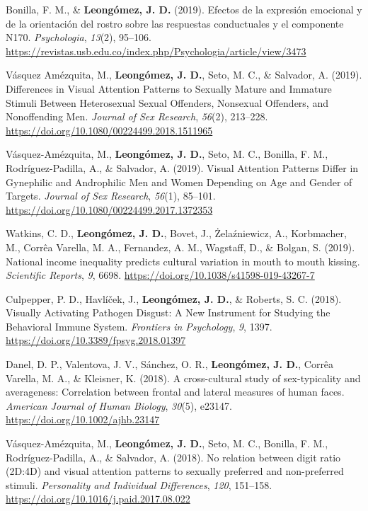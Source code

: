 \documentclass[11pt, a4paper]{awesome-cv}
\begin{document}
\leavevmode\hypertarget{ref-BonillaCarreno2019}{}%
Bonilla, F. M., \& \textbf{Leongómez, J. D.} (2019). {Efectos de la
expresi{ó}n emocional y de la orientaci{ó}n del rostro sobre las
respuestas conductuales y el componente N170}. \emph{Psychologia},
\emph{13}(2), 95--106.
\url{https://revistas.usb.edu.co/index.php/Psychologia/article/view/3473}

\leavevmode\hypertarget{ref-VasquezAmezquita2019}{}%
Vásquez Amézquita, M., \textbf{Leongómez, J. D.}, Seto, M. C., \&
Salvador, A. (2019). {Differences in Visual Attention Patterns to
Sexually Mature and Immature Stimuli Between Heterosexual Sexual
Offenders, Nonsexual Offenders, and Nonoffending Men}. \emph{Journal of
Sex Research}, \emph{56}(2), 213--228.
\url{https://doi.org/10.1080/00224499.2018.1511965}

\leavevmode\hypertarget{ref-Vasquez-Amezquita2017}{}%
Vásquez-Amézquita, M., \textbf{Leongómez, J. D.}, Seto, M. C., Bonilla,
F. M., Rodríguez-Padilla, A., \& Salvador, A. (2019). {Visual Attention
Patterns Differ in Gynephilic and Androphilic Men and Women Depending on
Age and Gender of Targets}. \emph{Journal of Sex Research},
\emph{56}(1), 85--101.
\url{https://doi.org/10.1080/00224499.2017.1372353}

\leavevmode\hypertarget{ref-Watkins2019}{}%
Watkins, C. D., \textbf{Leongómez, J. D.}, Bovet, J., Żelaźniewicz, A.,
Korbmacher, M., Corrêa Varella, M. A., Fernandez, A. M., Wagstaff, D.,
\& Bolgan, S. (2019). {National income inequality predicts cultural
variation in mouth to mouth kissing}. \emph{Scientific Reports},
\emph{9}, 6698. \url{https://doi.org/10.1038/s41598-019-43267-7}

\leavevmode\hypertarget{ref-Culpepper2018}{}%
Culpepper, P. D., Havlíček, J., \textbf{Leongómez, J. D.}, \& Roberts,
S. C. (2018). {Visually Activating Pathogen Disgust: A New Instrument
for Studying the Behavioral Immune System}. \emph{Frontiers in
Psychology}, \emph{9}, 1397.
\url{https://doi.org/10.3389/fpsyg.2018.01397}

\leavevmode\hypertarget{ref-Danel2017}{}%
Danel, D. P., Valentova, J. V., Sánchez, O. R.,
\textbf{Leongómez, J. D.}, Corrêa Varella, M. A., \& Kleisner, K.
(2018). {A cross-cultural study of sex-typicality and averageness:
Correlation between frontal and lateral measures of human faces}.
\emph{American Journal of Human Biology}, \emph{30}(5), e23147.
\url{https://doi.org/10.1002/ajhb.23147}

\leavevmode\hypertarget{ref-Vasquez-Amezquita2018}{}%
Vásquez-Amézquita, M., \textbf{Leongómez, J. D.}, Seto, M. C., Bonilla,
F. M., Rodríguez-Padilla, A., \& Salvador, A. (2018). {No relation
between digit ratio (2D:4D) and visual attention patterns to sexually
preferred and non-preferred stimuli}. \emph{Personality and Individual
Differences}, \emph{120}, 151--158.
\url{https://doi.org/10.1016/j.paid.2017.08.022}
\end{document}
